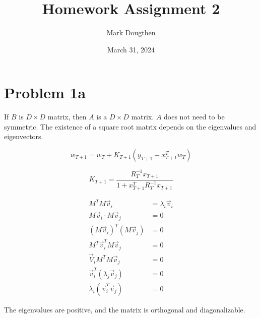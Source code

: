 \documentclass{article}
\title{Homework Assignment 2}
\author{Mark Dougthen}
\date{March 31, 2024}
\begin{document}
\maketitle

\section*{Problem 1a}

If $B$ is $D \times D$ matrix, then $A$ is a $D \times D$ matrix. $A$ does not need to be symmetric. The existence of a square root matrix depends on the eigenvalues and eigenvectors.

\begin{equation}
  w_{T+1} = w_T + K_{T+1} \left(y_{T+1} - x_{T+1}^T w_T\right)
\end{equation}

\begin{equation}
  K_{T+1} = \frac{R_T^{-1} x_{T+1}}{1 + x_{T+1}^T R_T^{-1} x_{T+1}}
\end{equation}

\begin{align}
  M^TM\vec{v}_{i} &= \lambda _{i}\vec{v}_{i} \\
  M\vec{v}_{i}\cdot M\vec{v}_{j} &= 0 \\
  (M\vec{v}_{i})^T(M\vec{v}_{j}) &= 0 \\
  M^T\vec{v}_{i}^TM\vec{v}_{j} &= 0 \\
  \vec{V}_{i}M^TM\vec{v}_{j} &= 0 \\
  \vec{v}_{i}^T(\lambda_j\vec{v}_{j}) &= 0 \\
  \lambda _{i}(\vec{v}_{i}^T\vec{v}_{j}) &= 0
\end{align}

The eigenvalues are positive, and the matrix is orthogonal and diagonalizable.
\end{document}
